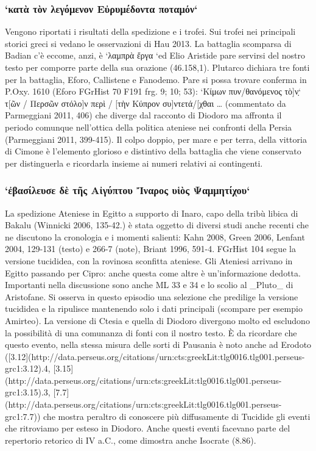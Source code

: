 {            \subsubsection{`κατὰ τὸν λεγόμενον Εὐρυμέδοντα ποταμόν`}
            Vengono riportati i risultati della spedizione e i trofei. Sui trofei nei principali storici greci si vedano le osservazioni di Hau 2013. La battaglia scomparsa di Badian c'è eccome, anzi, è  `λαμπρὰ ἔργα `ed Elio Aristide pare servirsi del nostro testo per comporre parte della sua orazione (46.158,1). Plutarco dichiara tre fonti per la battaglia, Eforo,  Callistene  e Fanodemo. Pare si possa trovare conferma in P.Oxy. 1610 (Eforo FGrHist 70 F191 frg. 9; 10; 53): `Κίμων πυν/θανόμενος τὸ]\d{ν` τ[ῶν / Περσῶν στόλο]ν περὶ / [τὴν Κύπρον συ]ντετά/[χθαι … }(commentato da Parmeggiani 2011, 406) che diverge dal racconto di  Diodoro ma affronta il periodo comunque nell'ottica della politica ateniese nei confronti della Persia (Parmeggiani 2011, 399-415). Il colpo doppio, per mare e per terra, della vittoria di  Cimone è l'elemento glorioso e distintivo della battaglia che viene conservato per distinguerla e ricordarla insieme ai numeri relativi ai contingenti. 
            \subsubsection{`ἐβασίλευσε δὲ τῆς Αἰγύπτου Ἴναρος υἱὸς Ψαμμητίχου`} 
            La spedizione Ateniese in Egitto a supporto di Inaro, capo della tribù libica di Bakalu (Winnicki 2006, 135-42.) è stata oggetto di diversi studi anche recenti che ne discutono la cronologia e i momenti salienti: Kahn 2008, Green 2006, Lenfant 2004, 129-131 (testo) e 266-7 (note), Briant 1996, 591-4. FGrHist 104 segue la versione tucididea, con la rovinosa sconfitta ateniese. Gli Ateniesi arrivano in Egitto passando per Cipro: anche questa come altre è un'informazione dedotta. Importanti nella discussione sono anche ML 33 e 34 e lo scolio al _Pluto_ di Aristofane. Si osserva in questo episodio una selezione che predilige la versione tucididea e la ripulisce mantenendo solo i dati principali (scompare per esempio Amirteo). La versione di Ctesia e quella di  Diodoro divergono molto ed escludono la possibilità di una comunanza di fonti con il nostro testo. È da ricordare che questo evento, nella stessa misura delle sorti di Pausania  è noto anche ad Erodoto ([3.12](http://data.perseus.org/citations/urn:cts:greekLit:tlg0016.tlg001.perseus-grc1:3.12).4, [3.15](http://data.perseus.org/citations/urn:cts:greekLit:tlg0016.tlg001.perseus-grc1:3.15).3, [7.7](http://data.perseus.org/citations/urn:cts:greekLit:tlg0016.tlg001.perseus-grc1:7.7)) che mostra peraltro di conoscere più diffusamente di Tucidide gli eventi che ritroviamo per esteso in Diodoro. Anche questi eventi facevano parte del repertorio retorico di IV a.C., come dimostra anche Isocrate (8.86).
}
